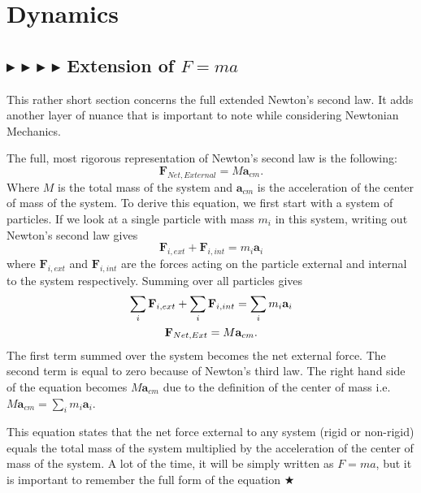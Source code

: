 \clearpage
\section{Dynamics}
\subsection{\color{OrangeRed} $\blacktriangleright$ \color{PineGreen} $\blacktriangleright$ \color{Goldenrod} $\blacktriangleright$ \color{Orchid} $\blacktriangleright$ \color{black} Extension of $F=ma$}
This rather short section concerns the full extended Newton's second law. It adds another layer of nuance that is important to note while considering Newtonian Mechanics.

\noindent The full, most rigorous representation of Newton's second law is the following:
\begin{equation}
    \boxed{\mathbf{F}_{Net, External} = M\mathbf{a}_{cm}}.
\end{equation}
\noindent Where $M$ is the total mass of the system and $\textbf{a}_{cm}$ is the acceleration of the center of mass of the system. To derive this equation, we first start with a system of particles. If we look at a single particle with mass $m_i$ in this system, writing out Newton's second law gives
\begin{equation}
    \mathbf{F}_{i,ext} + \mathbf{F}_{i,int} = m_i\mathbf{a}_i
\end{equation}
\noindent where $\mathbf{F}_{i,ext}$ and $\mathbf{F}_{i,int}$ are the forces acting on the particle external and internal to the system respectively. Summing over all particles gives
\begin{gather}
    \sum_i \mathbf{F}_{i,ext} + \sum_i \mathbf{F}_{i,int} = \sum_i m_i\mathbf{a}_i \nonumber \\
    \mathbf{F}_{Net,Ext} = M\mathbf{a}_{cm}.
\end{gather}
\noindent The first term summed over the system becomes the net external force. The second term is equal to zero because of Newton's third law. The right hand side of the equation becomes $M\mathbf{a}_{cm}$ due to the definition of the center of mass i.e. $M\mathbf{a}_{cm} = \sum_i m_i\mathbf{a}_i$.

\noindent This equation states that the net force external to any system (rigid or non-rigid) equals the total mass of the system multiplied by the acceleration of the center of mass of the system. A lot of the time, it will be simply written as $F=ma$, but it is important to remember the full form of the equation $\bigstar$

